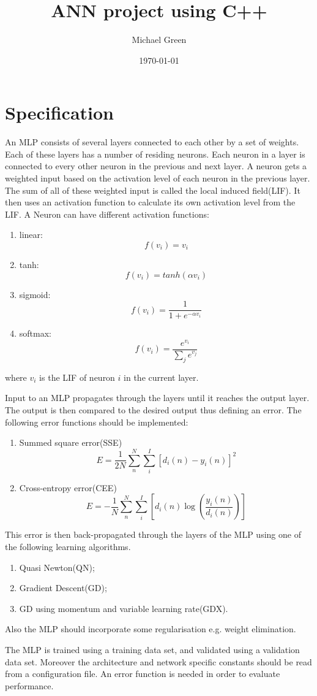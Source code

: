 \documentclass[a4paper, 10pt, twopage, notitlepage]{article}
\title{ANN project using C++}
\author{Michael Green}
\date{\today}
\begin{document}
\maketitle

\section{Specification} An MLP consists of several layers connected to each
other by a set of weights.  Each of these layers has a number of residing
neurons. Each neuron in a layer is connected to every other neuron in the
previous and next layer. A neuron gets a weighted input based on the
activation level of each neuron in the previous layer. The sum of all of these
weighted input is called the local induced field(LIF). It then uses an
activation function to calculate its own activation level from the LIF. A
Neuron can have different activation functions: 

\begin{enumerate}
	\item linear:  \[f(v_i)=v_i\]
	\item tanh: \[f(v_i)=tanh(\alpha v_i)\]
	\item sigmoid: \[f(v_i)=\frac{1}{1+e^{-\alpha v_i}}\]
	\item softmax: \[f(v_i)=\frac{e^{v_i}}{\sum_je^{v_j}}\]
\end{enumerate}

\noindent where $v_i$ is the LIF of neuron $i$ in the current layer.

Input to an MLP propagates through the layers until it reaches the output
layer. The output is then compared to the desired output thus defining an
error. The following error functions should be implemented:

\begin{enumerate}
	\item Summed square error(SSE)
		\[E=\frac{1}{2N}\sum_{n}^{N}\sum_{i}^{I}[d_i(n)-y_i(n)]^2\]
	\item Cross-entropy error(CEE)
		\[E=-\frac{1}{N}\sum_n^N\sum_i^I\left[d_i(n)\log\left(\frac{y_i(n)}{d_i(n)}\right)\right]\]
\end{enumerate}

\noindent This error is then back-propagated through the layers of the MLP using
one of the following learning algorithms.

\begin{enumerate}
	\item Quasi Newton(QN);
	\item Gradient Descent(GD);
	\item GD using momentum and variable learning rate(GDX).
\end{enumerate}

\noindent Also the MLP should incorporate some regularisation e.g. weight
elimination. 

The MLP is trained using a training data set, and validated using a validation
data set. Moreover the architecture and network specific constants should be read from a
configuration file. An error function is needed in order to evaluate
performance. 
\end{document}
